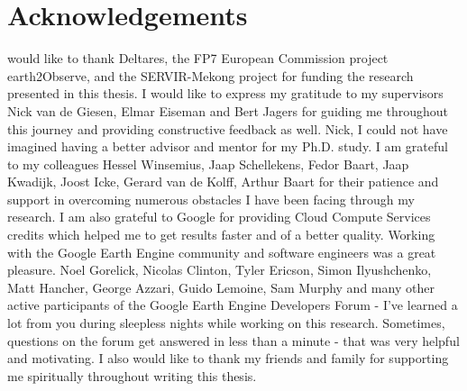 \chapter*{Acknowledgements}
\label{acknowledgements}

 would like to thank Deltares, the FP7 European Commission project earth2Observe, and the SERVIR-Mekong project for funding the research presented in this thesis. I would like to express my gratitude to my supervisors Nick van de Giesen, Elmar Eiseman and Bert Jagers for guiding me throughout this journey and providing constructive feedback as well. Nick, I could not have imagined having a better advisor and mentor for my Ph.D. study. I am grateful to my colleagues Hessel Winsemius, Jaap Schellekens, Fedor Baart, Jaap Kwadijk, Joost Icke, Gerard van de Kolff, Arthur Baart for their patience and support in overcoming numerous obstacles I have been facing through my research. I am also grateful to Google for providing Cloud Compute Services credits which helped me to get results faster and of a better quality. Working with the Google Earth Engine community and software engineers was a great pleasure. Noel Gorelick, Nicolas Clinton, Tyler Ericson, Simon Ilyushchenko, Matt Hancher, George Azzari, Guido Lemoine, Sam Murphy and many other active participants of the Google Earth Engine Developers Forum - I've learned a lot from you during sleepless nights while working on this research. Sometimes, questions on the forum get answered in less than a minute - that was very helpful and motivating. I also would like to thank my friends and family for supporting me spiritually throughout writing this thesis.
